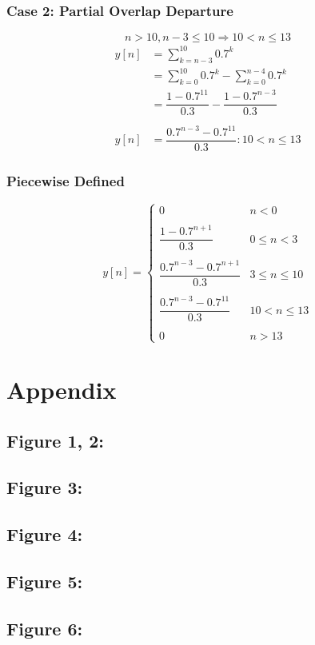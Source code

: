 \documentclass[a4paper,11pt]{article}
\begin{document}
			\subsubsection*{Case 2: Partial Overlap Departure}
			$$n > 10, n-3 \leq 10 \Rightarrow 10 < n \leq 13$$			
			\begin{align*}
			y[n] &= \sum_{k=n-3}^{10} 0.7^{k} \\
			     &= \sum_{k=0}^{10} 0.7^{k} - \sum_{k=0}^{n-4} 0.7^{k} \\
			     &= \dfrac{1-0.7^{11}}{0.3} - \dfrac{1-0.7^{n-3}}{0.3} \\ \\
			y[n] &= \dfrac{0.7^{n-3}-0.7^{11}}{0.3} : 10 < n \leq 13		
			\end{align*}
			\subsubsection*{Piecewise Defined}
			\[ y[n]=\begin{cases}
				0 & n<0 \\ \\
      			\dfrac{1-0.7^{n+1}}{0.3} &  0 \leq n < 3 \\ \\
      			\dfrac{0.7^{n-3}-0.7^{n+1}}{0.3} & 3 \leq n \leq 10 \\ \\
      			\dfrac{0.7^{n-3}-0.7^{11}}{0.3} & 10 < n \leq 13 \\ \\
      			0 & n>13
   				\end{cases}
			\]

\newpage
\section{Appendix}

\subsection*{Figure 1, 2:}


\subsection*{Figure 3:}


\subsection*{Figure 4:} 

\newpage
\subsection*{Figure 5:}


\subsection*{Figure 6:}

\end{document}
